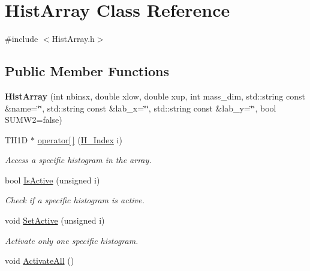 \hypertarget{classHistArray}{}\section{Hist\+Array Class Reference}
\label{classHistArray}


{\ttfamily \#include $<$Hist\+Array.\+h$>$}

\subsection*{Public Member Functions}
\begin{DoxyCompactItemize}
\item 
\hypertarget{classHistArray_a0458829293fd8da3993d7bde7843e8f6}{}{\bfseries Hist\+Array} (int nbinsx, double xlow, double xup, int mass\+\_\+dim, std\+::string const \&name=\char`\"{}\char`\"{}, std\+::string const \&lab\+\_\+x=\char`\"{}\char`\"{}, std\+::string const \&lab\+\_\+y=\char`\"{}\char`\"{}, bool S\+U\+M\+W2=false)\label{classHistArray_a0458829293fd8da3993d7bde7843e8f6}

\item 
T\+H1\+D $\ast$ \hyperlink{classHistArray_a914db159343d33fdb5b2ccb9210792fa}{operator\mbox{[}$\,$\mbox{]}} (\hyperlink{HistArray_8h_abdf25c9f0ab78c4243f63cb2bacf26d9}{H\+\_\+\+Index} i)
\begin{DoxyCompactList}\small\item\em Access a specific histogram in the array. \end{DoxyCompactList}\item 
\hypertarget{classHistArray_ab324fc243624240fe661ab18529f70c3}{}bool \hyperlink{classHistArray_ab324fc243624240fe661ab18529f70c3}{Is\+Active} (unsigned i)\label{classHistArray_ab324fc243624240fe661ab18529f70c3}

\begin{DoxyCompactList}\small\item\em Check if a specific histogram is active. \end{DoxyCompactList}\item 
\hypertarget{classHistArray_a5a83ba3fc0f0e30e41175d8a06bc24c3}{}void \hyperlink{classHistArray_a5a83ba3fc0f0e30e41175d8a06bc24c3}{Set\+Active} (unsigned i)\label{classHistArray_a5a83ba3fc0f0e30e41175d8a06bc24c3}

\begin{DoxyCompactList}\small\item\em Activate only one specific histogram. \end{DoxyCompactList}\item 
\hypertarget{classHistArray_ab04978eb90a87464603e46337da965f0}{}void \hyperlink{classHistArray_ab04978eb90a87464603e46337da965f0}{Activate\+All} ()\label{classHistArray_ab04978eb90a87464603e46337da965f0}


\end{DoxyCompactItemize}
